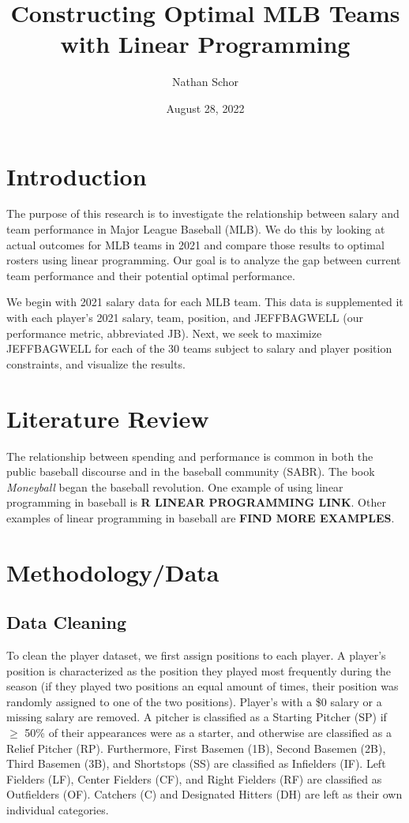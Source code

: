 \documentclass{article}
\title{Constructing Optimal MLB Teams with Linear Programming}
\author{Nathan Schor}
\date{August 28, 2022}
\begin{document}
\maketitle
\begin{singlespace}
\tableofcontents
\end{singlespace}

\newpage

\section{Introduction}

The purpose of this research is to investigate the relationship between salary and team performance in Major League Baseball (MLB). We do this by looking at actual outcomes for MLB teams in 2021 and compare those results to optimal rosters using linear programming. Our goal is to analyze the gap between current team performance and their potential optimal performance. 

We begin with 2021 salary data for each MLB team. This data is supplemented it with each player's 2021 salary, team, position, and JEFFBAGWELL (our performance metric, abbreviated JB). Next, we seek to maximize JEFFBAGWELL for each of the 30 teams subject to salary and player position constraints, and visualize the results. 

\section{Literature Review}

The relationship between spending and performance is common in both the public baseball discourse and in the baseball community (SABR). The book \emph{Moneyball} began the baseball revolution. One example of using linear programming in baseball is \textbf{R LINEAR PROGRAMMING LINK}. Other examples of linear programming in baseball are \textbf{FIND MORE EXAMPLES}. 

\section{Methodology/Data}

\subsection{Data Cleaning}

To clean the player dataset, we first assign positions to each player. A player's position is characterized as the position they played most frequently during the season (if they played two positions an equal amount of times, their position was randomly assigned to one of the two positions). Player's with a \$0 salary or a missing salary are removed. A pitcher is classified as a Starting Pitcher (SP) if $\geq$ 50\% of their appearances were as a starter, and otherwise are classified as a Relief Pitcher (RP). Furthermore, First Basemen (1B), Second Basemen (2B), Third Basemen (3B), and Shortstops (SS) are classified as Infielders (IF). Left Fielders (LF), Center Fielders (CF), and Right Fielders (RF) are classified as Outfielders (OF). Catchers (C) and Designated Hitters (DH) are left as their own individual categories. 
\end{document}
